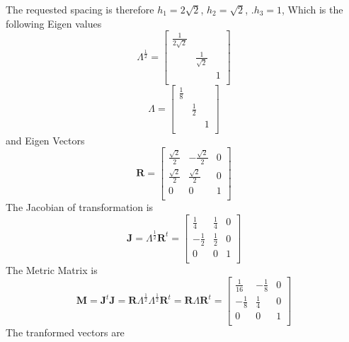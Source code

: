 \documentclass{article}
\begin{document}
The requested spacing is therefore $h_1=2\sqrt{2}$, $h_2=\sqrt{2}$, .$h_3=1$, 
Which is the following Eigen values
\begin{equation}
 \Lambda^\frac{1}{2}=\left[
 \begin{array}{ccc}
   \frac{1}{2\sqrt{2}}&&\\
   &\frac{1}{\sqrt{2}}&\\
   &&1\\
 \end{array}\right]
\end{equation}
\begin{equation}
 \Lambda=\left[
 \begin{array}{ccc}
   \frac{1}{8}&&\\
   &\frac{1}{2}&\\
   &&1\\
 \end{array}\right]
\end{equation}
and Eigen Vectors
\begin{equation}
 \mathbf{R}=\left[
 \begin{array}{ccc}
   \frac{\sqrt{2}}{2}&-\frac{\sqrt{2}}{2}&0\\
   \frac{\sqrt{2}}{2}&\frac{\sqrt{2}}{2}&0\\
   0&0&1\\
 \end{array}\right]
\end{equation}
The Jacobian of transformation is
\begin{equation}
 \mathbf{J}=\Lambda^\frac{1}{2}\mathbf{R}^t=\left[
 \begin{array}{ccc}
   \frac{1}{4}&\frac{1}{4}&0\\
   -\frac{1}{2}&\frac{1}{2}&0\\
   0&0&1\\
 \end{array}\right]
\end{equation}
The Metric Matrix is 
\begin{equation}
 \mathbf{M}=
  \mathbf{J}^t\mathbf{J}=
  \mathbf{R}\Lambda^\frac{1}{2}\Lambda^\frac{1}{2}\mathbf{R}^t=
  \mathbf{R}\Lambda\mathbf{R}^t=
  \left[\begin{array}{ccc}
   \frac{1}{16}&-\frac{1}{8}&0\\
   -\frac{1}{8}&\frac{1}{4}&0\\
   0&0&1\\
 \end{array}\right]
\end{equation}
The tranformed vectors are
\end{document}
